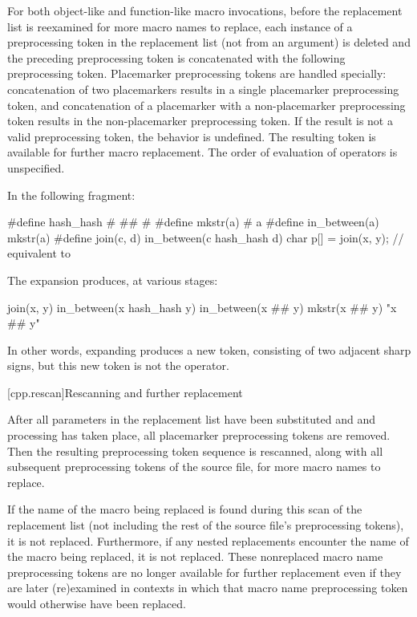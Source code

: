\pnum
For both object-like and function-like macro invocations, before the
replacement list is reexamined for more macro names to replace,
each instance of a
\tcode{\#\#}
preprocessing token in the replacement list
(not from an argument) is deleted and the
preceding preprocessing token is concatenated
with the following preprocessing token.
Placemarker preprocessing tokens are handled specially: concatenation
of two placemarkers results in a single placemarker preprocessing token, and
concatenation of a placemarker with a non-placemarker preprocessing token results
in the non-placemarker preprocessing token.
If the result is not a valid preprocessing token,
the behavior is undefined.
The resulting token is available for further macro replacement.
The order of evaluation of
\tcode{\#\#}
operators is unspecified.

\begin{example} In the following fragment:

\begin{codeblock}
#define hash_hash # ## #
#define mkstr(a) # a
#define in_between(a) mkstr(a)
#define join(c, d) in_between(c hash_hash d)
char p[] = join(x, y);          // equivalent to 
\end{codeblock}

The expansion produces, at various stages:

\begin{codeblock}
join(x, y)
in_between(x hash_hash y)
in_between(x ## y)
mkstr(x ## y)
"x ## y"
\end{codeblock}

In other words, expanding  produces a new token,
consisting of two adjacent sharp signs, but this new token is not the
\tcode{\#\#} operator. \end{example}

[cpp.rescan]{Rescanning and further replacement}%
%

\pnum
After all parameters in the replacement list have been substituted and \tcode{\#} and \tcode{\#\#} processing has taken
place, all placemarker preprocessing tokens are removed. Then
the resulting preprocessing token sequence is rescanned, along with all
subsequent preprocessing tokens of the source file, for more macro names
to replace.

\pnum
If the name of the macro being replaced is found during this scan of
the replacement list
(not including the rest of the source file's preprocessing tokens),
it is not replaced.
Furthermore,
if any nested replacements encounter the name of the macro being replaced,
it is not replaced.
These nonreplaced macro name preprocessing tokens are no longer available
for further replacement even if they are later (re)examined in contexts
in which that macro name preprocessing token would otherwise have been
replaced.

